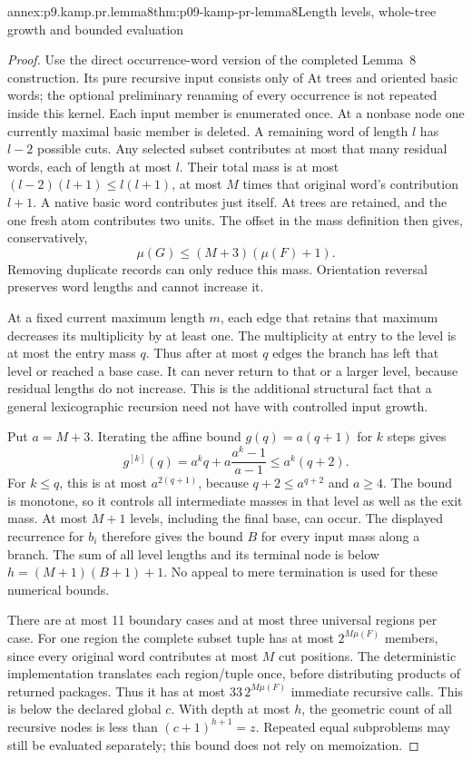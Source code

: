 \begin{annexitem}{annex:p9.kamp.pr.lemma8}{thm:p09-kamp-pr-lemma8}{Length levels, whole-tree growth and bounded evaluation}
\begin{proof}
Use the direct occurrence-word version of the completed Lemma~8
construction. Its pure recursive input consists only of At trees
and oriented basic words; the optional preliminary renaming of
every occurrence is not repeated inside this kernel. Each input
member is enumerated once. At a nonbase node one currently maximal
basic member is deleted. A remaining word of length \(l\)
has \(l-2\) possible cuts. Any selected subset contributes
at most that many residual words, each of length at most \(l\).
Their total mass is at most
\((l-2)(l+1)\leq l(l+1)\), at most \(M\) times that
original word's contribution \(l+1\). A native basic word
contributes just itself. At trees are retained, and the one fresh
atom contributes two units. The offset in the mass definition
then gives, conservatively,
\[
                         \mu(G)\leq(M+3)(\mu(F)+1).
 \tag{1}
\]
Removing duplicate records can only reduce this mass. Orientation
reversal preserves word lengths and cannot increase it.

At a fixed current maximum length \(m\), each edge that
retains that maximum decreases its multiplicity by at least one.
The multiplicity at entry to the level is at most the entry
mass \(q\). Thus after at most \(q\) edges the branch
has left that level or reached a base case. It can never return
to that or a larger level, because residual lengths do not increase.
This is the additional structural fact that a general lexicographic
recursion need not have with controlled input growth.

Put \(a=M+3\). Iterating the affine bound \(g(q)=a(q+1)\)
for \(k\) steps gives
\[
             g^{[k]}(q)=a^kq+a\frac{a^k-1}{a-1}
                         \leq a^k(q+2).
\]
For \(k\leq q\), this is at most \(a^{2(q+1)}\),
because \(q+2\leq a^{q+2}\) and \(a\geq4\).
The bound is monotone, so it controls all intermediate masses in
that level as well as the exit mass. At most \(M+1\)
levels, including the final base, can occur. The displayed
recurrence for \(b_i\) therefore gives the bound \(B\)
for every input mass along a branch. The sum of all level lengths
and its terminal node is below \(h=(M+1)(B+1)+1\).
No appeal to mere termination is used for these numerical bounds.

There are at most 11 boundary cases and at most three universal
regions per case. For one region the complete subset tuple has
at most \(2^{M\mu(F)}\) members, since every original word
contributes at most \(M\) cut positions. The deterministic
implementation translates each region/tuple once, before distributing
products of returned packages. Thus it has at most
\(33\,2^{M\mu(F)}\) immediate recursive calls. This is
below the declared global \(c\). With depth at most \(h\),
the geometric count of all recursive nodes is less than
\((c+1)^{h+1}=z\). Repeated equal subproblems may still be
evaluated separately; this bound does not rely on memoization.


\end{proof}
\end{annexitem}
